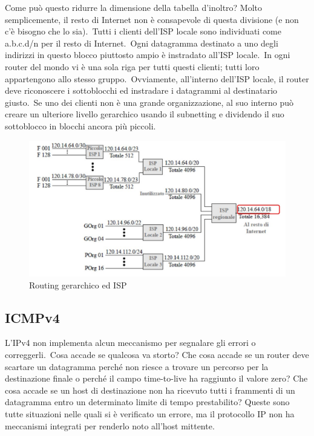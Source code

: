 Come può questo ridurre la dimensione della tabella d'inoltro? Molto semplicemente, il resto di Internet non è consapevole di questa divisione (e non c'è bisogno che lo sia).\
Tutti i clienti dell'ISP locale sono individuati come a.b.c.d/n per il resto di Internet.\
Ogni datagramma destinato a uno degli indirizzi in questo blocco piuttosto ampio è instradato all'ISP locale.\
In ogni router del mondo vi è una sola riga per tutti questi clienti; tutti loro appartengono allo stesso gruppo.\
Ovviamente, all'interno dell'ISP locale, il router deve riconoscere i sottoblocchi ed instradare i datagrammi al destinatario giusto.\
Se uno dei clienti non è una grande organizzazione, al suo interno può creare un ulteriore livello gerarchico usando il subnetting e dividendo il suo sottoblocco in blocchi ancora più piccoli.

\begin{figure}[H]
    \centering
    \includegraphics[width=\textwidth]{immagini/Routing_gerarchico.jpg}
    \caption*{Routing gerarchico ed ISP}
\end{figure}

\subsection{ICMPv4}

L'IPv4 non implementa alcun meccanismo per segnalare gli errori o correggerli.\
Cosa accade se qualcosa va storto? Che cosa accade se un router deve scartare un datagramma perché non riesce a trovare un percorso per la destinazione finale o perché il campo time-to-live ha raggiunto il valore zero? Che cosa accade se un host di destinazione non ha ricevuto tutti i frammenti di un datagramma entro un determinato limite di tempo prestabilito? Queste sono tutte situazioni nelle quali si è verificato un errore, ma il protocollo IP non ha meccanismi integrati per renderlo noto all'host mittente.

